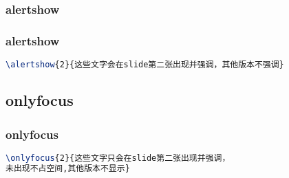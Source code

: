 \documentclass[slide]{myslide} %
\begin{document}
	\subsubsection{alertshow}

\begin{frame}[fragile]
	\frametitle{alertshow}
\begin{lstlisting}[language=tex]
\alertshow{2}{这些文字会在slide第二张出现并强调，其他版本不强调}
\end{lstlisting}
\end{frame}

\subsection{onlyfocus}
\begin{frame}[fragile]
	\frametitle{onlyfocus}
\begin{lstlisting}[language=tex]
\onlyfocus{2}{这些文字只会在slide第二张出现并强调，
未出现不占空间,其他版本不显示}
\end{lstlisting}
\end{frame}
\end{document}
